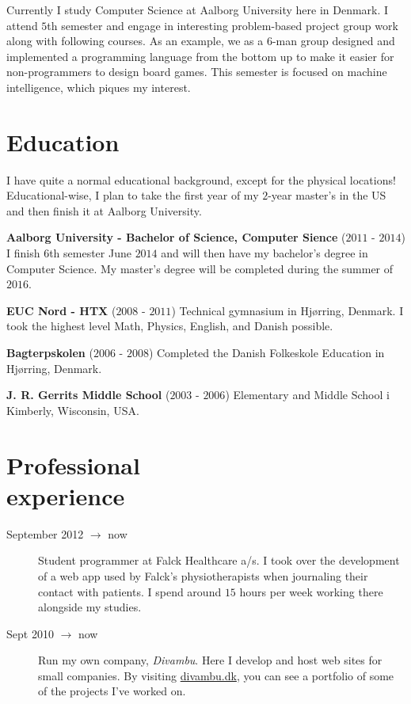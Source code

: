 \documentclass[margin,line,a4paper]{resume}
\begin{document}
\begin{resume}
    Currently I study Computer Science at Aalborg University here
    in Denmark. I attend $5$th semester and engage in interesting
    problem-based project group work along with following courses.
    As an example, we as a $6$-man group designed and implemented a
    programming language from the bottom up to make it easier for
    non-programmers to design board games. This semester is focused on
    machine intelligence, which piques my interest.

    \section{\mysidestyle Education}
    I have quite a normal educational background, except for the
    physical locations! Educational-wise, I plan to take the first year of
    my $2$-year master's in the US and then finish it at Aalborg University.

    \textbf{Aalborg University - Bachelor of Science, Computer Sience}
    ($2011$ - $2014$) I finish $6$th semester June $2014$ and will then
    have my bachelor's degree in Computer Science. My master's degree
    will be completed during the summer of $2016$.
      
    \textbf{EUC Nord - HTX} ($2008$ - $2011$) Technical gymnasium in
    Hjørring, Denmark. I took the highest level Math, Physics, English,
    and Danish possible.
    
    \textbf{Bagterpskolen} ($2006$ - $2008$) Completed the Danish
    Folkeskole Education in Hjørring, Denmark.

    \textbf{J. R. Gerrits Middle School} ($2003$ - $2006$) Elementary and 
    Middle School i Kimberly, Wisconsin, USA.

\section{\mysidestyle Professional\\experience}\vspace{1mm}
\begin{description}

  \item[September 2012 $\rightarrow$ now] Student programmer at Falck
  Healthcare a/s. I took over the development of a web app used by
  Falck's physiotherapists when journaling their contact with patients.
  I spend around $15$ hours per week working there alongside my studies.

  \item[Sept 2010 $\rightarrow$ now] Run my own company,
    \emph{Divambu}. Here I develop and host web sites for small companies.
    By visiting \url{divambu.dk}, you can see a portfolio of some of the
    projects I've worked on.


\end{description}
\end{resume}
\end{document}
